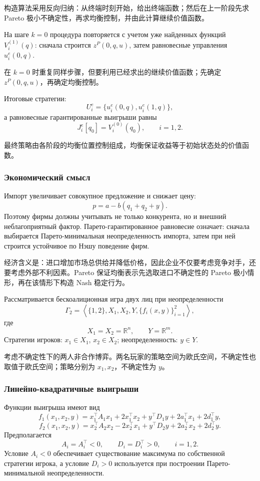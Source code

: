 \documentclass[12pt,a4paper]{article}
\newcommand{\R}{\mathbb{R}}
\newcommand{\zh}[1]{\par\noindent #1\par}
\begin{document}
\zh{构造算法采用反向归纳：从终端时刻开始，给出终端函数；然后在上一阶段先求 Pareto 极小不确定性，再求均衡控制，并由此计算继续价值函数。}

На шаге $k=0$ процедура повторяется с учетом уже найденных функций $V_i^{(1)}(q)$: сначала строится $z^P(0,q,u)$, затем равновесные управления $u_i^e(0,q)$.

\zh{在 $k=0$ 时重复同样步骤，但要利用已经求出的继续价值函数；先确定 $z^P(0,q,u)$，再确定均衡控制。}

Итоговые стратегии:
\[
U_i^e=\{u_i^e(0,q),u_i^e(1,q)\},
\]
а равновесные гарантированные выигрыши равны
\[
J_i^e[q_0]=V_i^{(0)}(q_0),\qquad i=1,2.
\]

\zh{最终策略由各阶段的均衡位置控制组成，均衡保证收益等于初始状态处的价值函数。}

\subsubsection{Экономический смысл}
Импорт увеличивает совокупное предложение и снижает цену:
\[
p=a-b(q_1+q_2+y).
\]
Поэтому фирмы должны учитывать не только конкурента, но и внешний неблагоприятный фактор. Парето-гарантированное равновесие означает: сначала выбирается Парето-минимальная неопределенность импорта, затем при ней строится устойчивое по Нэшу поведение фирм.

\zh{经济含义是：进口增加市场总供给并降低价格，因此企业不仅要考虑竞争对手，还要考虑外部不利因素。Pareto 保证均衡表示先选取进口不确定性的 Pareto 极小情形，再在该情形下构造 Nash 稳定行为。}

\newpage
{}


Рассматривается бескоалиционная игра двух лиц при неопределенности
\[
\Gamma_2=\left\langle \{1,2\},X_1,X_2,Y,\{f_i(x,y)\}_{i=1}^2\right\rangle,
\]
где
\[
X_1=X_2=\R^n,
\qquad Y=\R^m.
\]
Стратегии игроков: $x_1\in X_1$, $x_2\in X_2$; неопределенность: $y\in Y$.

\zh{考虑不确定性下的两人非合作博弈。两名玩家的策略空间为欧氏空间，不确定性也取值于欧氏空间；策略分别为 $x_1,x_2$，不确定性为 $y$。}

\subsubsection{Линейно-квадратичные выигрыши}
Функции выигрыша имеют вид
\[
f_1(x_1,x_2,y)=x_1^\top A_1x_1+2x_1^\top x_2+y^\top D_1y+2a_1^\top x_1+2d_1^\top y,
\]
\[
f_2(x_1,x_2,y)=x_2^\top A_2x_2-2x_2^\top x_1+y^\top D_2y+2a_2^\top x_2+2d_2^\top y.
\]
Предполагается
\[
A_i=A_i^\top<0,
\qquad D_i=D_i^\top>0,
\qquad i=1,2.
\]
Условие $A_i<0$ обеспечивает существование максимума по собственной стратегии игрока, а условие $D_i>0$ используется при построении Парето-минимальной неопределенности.
\end{document}
